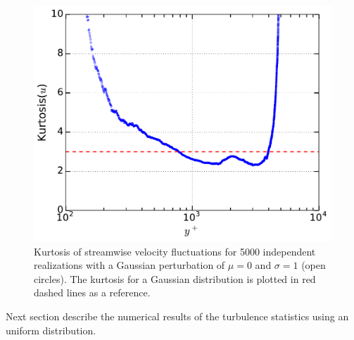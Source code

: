 \documentclass[aps,reprint,amsmath,amssymb,pra]{revtex4-1}%
\begin{document}
\begin{figure}[tb] 
\includegraphics[scale=0.46]{figures/kurtosis_5000_assembles_gauss100}
\caption{\label{fig:kurtgaus100} Kurtosis of streamwise velocity fluctuations for 5000 independent realizations with a Gaussian perturbation of $\mu=0$ and $\sigma=1$ (open circles). The kurtosis for a Gaussian distribution is plotted in red dashed lines as a reference.}
\end{figure}
Next section describe the numerical results of the turbulence statistics using an uniform distribution.
\end{document}
